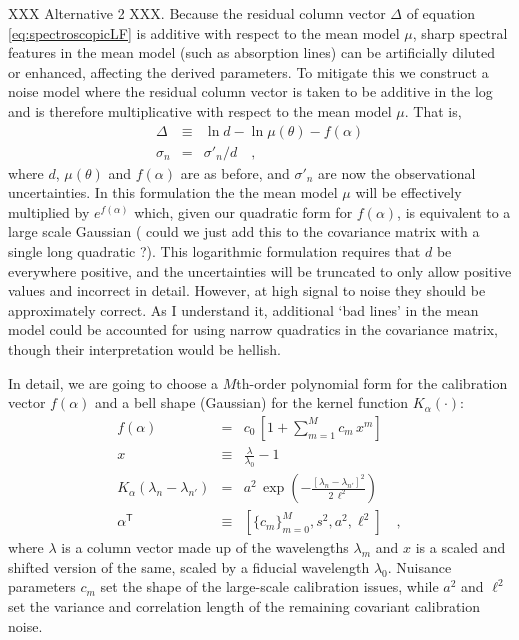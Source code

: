 \documentclass[iop,numberedappendix]{emulateapj}
\newcommand{\transpose}[1]{{#1}^{\!\mathsf T}}
\begin{document}
XXX Alternative 2 XXX.
Because the residual column vector $\Delta$ of equation
\ref{eq:spectroscopicLF} is additive with respect to the mean model
$\mu$, sharp spectral features in the mean model (such as absorption
lines) can be artificially diluted or enhanced, affecting the derived
parameters. To mitigate this we construct a noise model where the
residual column vector is taken to be additive in the log and is
therefore multiplicative with respect to the mean model $\mu$.  That
is,
\begin{eqnarray}\label{eq:spectroscopicLFalt2} 
\Delta &\equiv&
\ln d - \ln \mu(\theta) - f(\alpha) \\
\sigma_{n} & = & \sigma'_n / d
\quad ,
\end{eqnarray}
where $d$, $\mu(\theta)$ and $f(\alpha)$ are as before, and
$\sigma'_{n}$ are now the observational uncertainties. In this
formulation the the mean model $\mu$ will be effectively multiplied by
$e ^{f(\alpha)}$ which, given our quadratic form for $f(\alpha)$, is
equivalent to a large scale Gaussian ({\color{red} could we just add
this to the covariance matrix with a single long quadratic ?}).  This
logarithmic formulation requires that $d$ be everywhere positive, and
the uncertainties will be truncated to only allow positive values and
incorrect in detail.  However, at high signal to noise they should be
approximately correct. {\color{red} As I understand it, additional
`bad lines' in the mean model could be accounted for using narrow
quadratics in the covariance matrix, though their interpretation would
be hellish.}

In detail, we are going to choose a $M$th-order polynomial form for
the calibration vector $f(\alpha)$ and a bell shape (Gaussian) for the
kernel function $K_\alpha(\cdot)$:
\begin{eqnarray}\displaystyle
f(\alpha) &=& c_0\,[1 + \sum_{m=1}^M c_m\,x^m]
\\
x &\equiv& \frac{\lambda}{\lambda_0} - 1
\\
K_\alpha(\lambda_n - \lambda_{n'}) &=& a^2\,\exp(-\frac{[\lambda_n - \lambda_{n'}]^2}{2\,\ell^2})
\\
\transpose{\alpha} &\equiv& \left[ \{c_m\}_{m=0}^M, s^2, a^2, \ell^2 \right]
\quad ,
\end{eqnarray}
where $\lambda$ is a column vector made up of the wavelengths $\lambda_m$
and $x$ is a scaled and shifted version of the same,
scaled by a fiducial wavelength $\lambda_0$.
Nuisance parameters $c_m$ set the shape of the large-scale calibration
issues, while $a^2$ and $\ell^2$ set the variance and correlation
length of the remaining covariant calibration noise.
\end{document}
